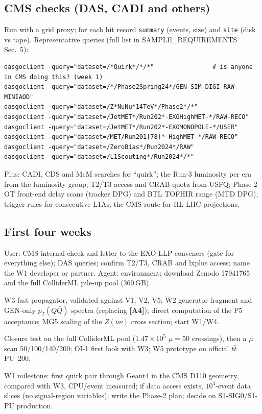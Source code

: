 \documentclass[11pt,a4paper]{article}
\newcommand{\pTQQ}{p_T(Q\bar Q)}
\newcommand{\lab}[1]{\textbf{[#1]}}
\begin{document}
\subsection{CMS checks (DAS, CADI and others)}
Run with a grid proxy; for each hit record \texttt{summary} (events, size) and \texttt{site} (disk vs tape). Representative queries (full list in SAMPLE\_REQUIREMENTS Sec.~5):
{\footnotesize
\begin{verbatim}
dasgoclient -query="dataset=/*Quirk*/*/*"                # is anyone in CMS doing this? (week 1)
dasgoclient -query="dataset=/*/Phase2Spring24*/GEN-SIM-DIGI-RAW-MINIAOD"
dasgoclient -query="dataset=/Z*NuNu*14TeV*/Phase2*/*"
dasgoclient -query="dataset=/JetMET*/Run202*-EXOHighMET-*/RAW-RECO"
dasgoclient -query="dataset=/JetMET*/Run202*-EXOMONOPOLE-*/USER"
dasgoclient -query="dataset=/MET/Run201[78]*-HighMET-*/RAW-RECO"
dasgoclient -query="dataset=/ZeroBias*/Run2024*/RAW"
dasgoclient -query="dataset=/L1Scouting*/Run2024*/*"
\end{verbatim}
}
Plus: CADI, CDS and McM searches for ``quirk''; the Run-3 luminosity per era from the luminosity group; T2/T3 access and CRAB quota from USFQ; Phase-2 OT front-end delay scans (tracker DPG) and BTL TOFHIR range (MTD DPG); trigger rules for consecutive L1As; the CMS route for HL-LHC projections.

\subsection{First four weeks}
\begin{description}[leftmargin=1.6cm,style=nextline]
\item[Week 1] User: CMS-internal check and letter to the EXO-LLP conveners (gate for everything else); DAS queries; confirm T2/T3, CRAB and lxplus access; name the W1 developer or partner. Agent: environment; download Zenodo 17941765 and the full ColliderML pile-up pool (360\,GB).
\item[Week 2] W3 fast propagator, validated against V1, V2, V5; W2 generator fragment and GEN-only $\pTQQ$ spectra (replacing \lab{A4}); direct computation of the P5 acceptance; MG5 scaling of the $Z(\nu\nu)$ cross section; start W1/W4.
\item[Week 3] Closure test on the full ColliderML pool ($1.47\times10^5$ $\mu=50$ crossings), then a $\mu$ scan 50/100/140/200; OI-1 first look with W3; W5 prototype on official $t\bar t$ PU~200.
\item[Week 4] W1 milestone: first quirk pair through Geant4 in the CMS D110 geometry, compared with W3, CPU/event measured; if data access exists, $10^4$-event data slices (no signal-region variables); write the Phase-2 plan; decide on S1-SIG0/S1-PU production.
\end{description}
\end{document}
